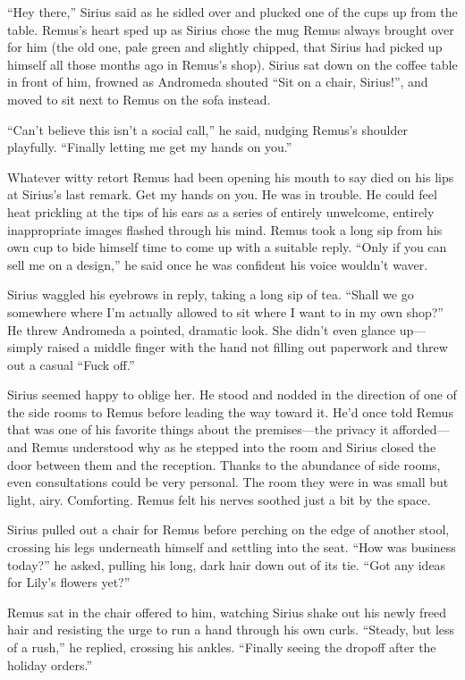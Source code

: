 “Hey there,” Sirius said as he sidled over and plucked one of the cups up from the table. Remus’s heart sped up as Sirius chose the mug Remus always brought over for him (the old one, pale green and slightly chipped, that Sirius had picked up himself all those months ago in Remus’s shop). Sirius sat down on the coffee table in front of him, frowned as Andromeda shouted “Sit on a chair, Sirius!”, and moved to sit next to Remus on the sofa instead.

“Can’t believe this isn’t a social call,” he said, nudging Remus’s shoulder playfully. “Finally letting me get my hands on you.”

Whatever witty retort Remus had been opening his mouth to say died on his lips at Sirius’s last remark. Get my hands on you. He was in trouble. He could feel heat prickling at the tips of his ears as a series of entirely unwelcome, entirely inappropriate images flashed through his mind. Remus took a long sip from his own cup to bide himself time to come up with a suitable reply. “Only if you can sell me on a design,” he said once he was confident his voice wouldn’t waver.

Sirius waggled his eyebrows in reply, taking a long sip of tea. “Shall we go somewhere where I’m actually allowed to sit where I want to in my own shop?” He threw Andromeda a pointed, dramatic look. She didn’t even glance up—simply raised a middle finger with the hand not filling out paperwork and threw out a casual “Fuck off.”

Sirius seemed happy to oblige her. He stood and nodded in the direction of one of the side rooms to Remus before leading the way toward it. He’d once told Remus that was one of his favorite things about the premises—the privacy it afforded—and Remus understood why as he stepped into the room and Sirius closed the door between them and the reception. Thanks to the abundance of side rooms, even consultations could be very personal. The room they were in was small but light, airy. Comforting. Remus felt his nerves soothed just a bit by the space.

Sirius pulled out a chair for Remus before perching on the edge of another stool, crossing his legs underneath himself and settling into the seat. “How was business today?” he asked, pulling his long, dark hair down out of its tie. “Got any ideas for Lily’s flowers yet?”

Remus sat in the chair offered to him, watching Sirius shake out his newly freed hair and resisting the urge to run a hand through his own curls. “Steady, but less of a rush,” he replied, crossing his ankles. “Finally seeing the dropoff after the holiday orders.”

